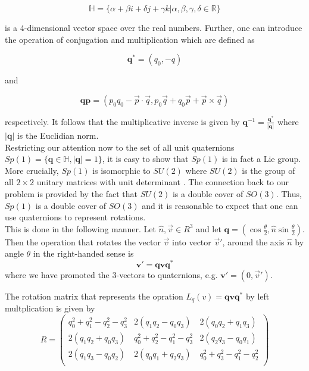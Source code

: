 \documentclass[aps, prd, amsmath, floats, floatfix, twocolumn,superscriptaddress, nofootinbib, showpacs]{revtex4-1}
\theoremstyle{plain}
\theoremstyle{definition}
\newcommand{\w}[1]{\mathbf{#1}}
\begin{document}
\[ \mathbb{H}=\{\alpha + \beta i +\delta j +\gamma k | \alpha,\beta, \gamma,
\delta\in\mathbb{R} \} \]

is a 4-dimensional vector space over the real numbers. 
Further, one can introduce the operation of conjugation and multiplication 
which are defined as

\[\w{q}^{*}=(q_{0},-q)\]

and

\[\w{qp} = (p_{0}q_{0}- \vec{p}\cdot\vec{q},p_{0} \vec{q} + q_{0} \vec{p} + \vec{p} 
\times \vec{q}) \]

respectively. It follows that the multiplicative inverse is given by 
$ \w{q}^{-1}=\frac{\w{q}^{*}}{|\w{q}|} $ where $ |\w{q}| $ is the Euclidian norm. \\

Restricting our attention now to the set of all unit quaternions 
$ Sp(1) = \{\w{q}\in \mathbb{H},|\w{q}|=1\} $, it is easy to show that $ Sp(1) $ is 
in fact a Lie group. More crucially, $ Sp(1)$ is isomorphic to $SU(2) $ 
 where $ SU(2) $ is the group of all $ 2 \times 2 $ unitary matrices with unit determinant \cite{altmann2005rotations}.  The connection back to our problem is 
provided by the fact that $ SU(2) $ is a double cover of $ SO(3) $. Thus, 
$ Sp(1) $ is a double cover of $ SO(3) $ and it is reasonable to expect that 
one can use quaternions to represent rotations. \\

This is done in the following manner.  Let $\hat{n},\vec{v} \in R^3$ and let 
$\w{q}=(\cos\frac{\theta}{2},\hat{n}\sin\frac{\theta}{2})$. Then the operation 
that rotates the vector $\vec{v}$ into vector $\vec{v}'$, around the axis $\hat{n}$ by angle $\theta$ in the right-handed sense is \[\w{v}' = \w{qvq}^*\] where we have promoted the 3-vectors to quaternions, e.g. $\w{v}'=(0,\vec{v}')$.

The rotation matrix that represents the opration $L_q(v)=\w{qvq^*}$ by left 
multplication is given by 
{\small
\[R=\begin{pmatrix}
q_0^2+q_1^2-q_2^2-q_3^2 & 2(q_1q_2-q_0q_3) & 2(q_0q_2+q_1q_3)\\
2(q_1q_2+q_0q_3) & q_0^2+q_2^2-q_1^2-q_3^2 & 2(q_2q_3-q_0q_1)\\
2(q_1q_3-q_0q_2) & 2(q_0q_1+q_2q_3)  &  q_0^2+q_3^2-q_1^2-q_2^2\\
\end{pmatrix}\]
}
\end{document}
